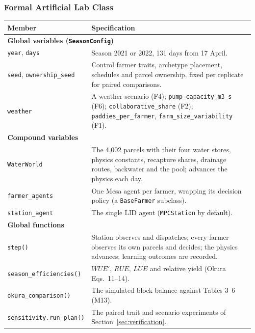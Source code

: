 \documentclass{article}
\begin{document}
\subsubsection{Formal Artificial Lab Class}
\begin{changed}
\centering
\small
\begin{tabular}{|p{3.9cm}|p{12.6cm}|}
\hline
\rowcolor[HTML]{F8F319}
\textbf{Member} & \textbf{Specification} \\ \hline
\multicolumn{2}{|l|}{\cellcolor{gray!20}\textbf{Global variables (\texttt{SeasonConfig})}} \\ \hline
\texttt{year}, \texttt{days} & Season 2021 or 2022, 131 days from 17 April. \\ \hline
\texttt{seed}, \texttt{ownership\_seed} & Control farmer traits, archetype placement, schedules and parcel ownership, fixed per replicate for paired comparisons. \\ \hline
\texttt{weather} & A weather scenario (F4); \texttt{pump\_capacity\_m3\_s} (F6); \texttt{collaborative\_share} (F2); \texttt{paddies\_per\_farmer}, \texttt{farm\_size\_variability} (F1). \\ \hline
\multicolumn{2}{|l|}{\cellcolor{gray!20}\textbf{Compound variables}} \\ \hline
\texttt{WaterWorld} & The 4,002 parcels with their four water stores, physics constants, recapture shares, drainage routes, backwater and the pool; advances the physics each day. \\ \hline
\texttt{farmer\_agents} & One Mesa agent per farmer, wrapping its decision policy (a \texttt{BaseFarmer} subclass). \\ \hline
\texttt{station\_agent} & The single LID agent (\texttt{MPCStation} by default). \\ \hline
\multicolumn{2}{|l|}{\cellcolor{gray!20}\textbf{Global functions}} \\ \hline
\texttt{step()} & Station observes and dispatches; every farmer observes its own parcels and decides; the physics advances; learning outcomes are recorded. \\ \hline
\texttt{season\_efficiencies()} & $WUE'$, $RUE$, $LUE$ and relative yield (Okura Eqs.~11--14). \\ \hline
\texttt{okura\_comparison()} & The simulated block balance against \cite{Okura2025WaterBalance} Tables 3--6 (M13). \\ \hline
\texttt{sensitivity.run\_plan()} & The paired trait and scenario experiments of Section~\ref{sec:verification}. \\ \hline
\end{tabular}
\label{tab:artificial_lab_class}
\end{changed}
\end{document}

